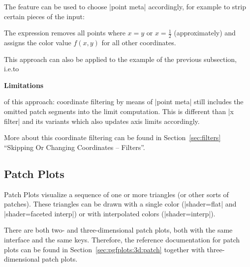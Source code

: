 {The feature can be used to choose |point meta| accordingly, for example to
strip certain pieces of the input:
%
\begin{codeexample}[]
\end{codeexample}

The expression removes all points where $x=y$ or $x=\frac12$ (approximately)
and assigns the color value $f(x,y)$ for all other coordinates.

This approach can also be applied to the example of the previous subsection,
i.e.\@ to
%
\begin{codeexample}[]
\end{codeexample}


\textbf{Limitations}

of this approach: coordinate filtering by means of |point meta| still includes
the omitted patch segments into the limit computation. This is different than
|x filter| and its variants which also updates axis limits accordingly.

More about this coordinate filtering can be found in Section~\ref{sec:filters}
``Skipping Or Changing Coordinates -- Filters''.


\subsection{Patch Plots}
\label{sec:pgfplots:2d:patch}

Patch Plots visualize a sequence of one or more triangles (or other sorts of
patches). These triangles can be drawn with a single color (|shader=flat| and
|shader=faceted interp|) or with interpolated colors (|shader=interp|).

There are both two- and three-dimensional patch plots, both with the same
interface and the same keys. Therefore, the reference documentation for patch
plots can be found in Section~\ref{sec:pgfplots:3d:patch} together with
three-dimensional patch plots.


}
